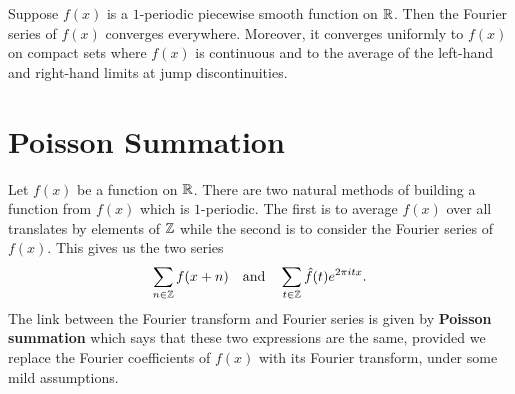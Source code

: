     \begin{theorem}\label{thm:Fourier_series_1_dimensional}
      Suppose \(f(x)\) is a \(1\)-periodic piecewise smooth function on \(\mathbb{R}\). Then the Fourier series of \(f(x)\) converges everywhere. Moreover, it converges uniformly to \(f(x)\) on compact sets where \(f(x)\) is continuous and to the average of the left-hand and right-hand limits at jump discontinuities. 
    \end{theorem}
  \section{Poisson Summation}\label{sec:Poisson_summation}
    Let \(f(x)\) be a function on \(\mathbb{R}\). There are two natural methods of building a function from \(f(x)\) which is \(1\)-periodic. The first is to average \(f(x)\) over all translates by elements of \(\mathbb{Z}\) while the second is to consider the Fourier series of \(f(x)\). This gives us the two series
    \[
      \sum_{n \in \mathbb{Z}}f(x+n) \quad \text{and} \quad \sum_{t \in \mathbb{Z}}\hat{f}(t)e^{2\pi itx}.
    \]
    The link between the Fourier transform and Fourier series is given by \textbf{Poisson summation} which says that these two expressions are the same, provided we replace the Fourier coefficients of \(f(x)\) with its Fourier transform, under some mild assumptions.

